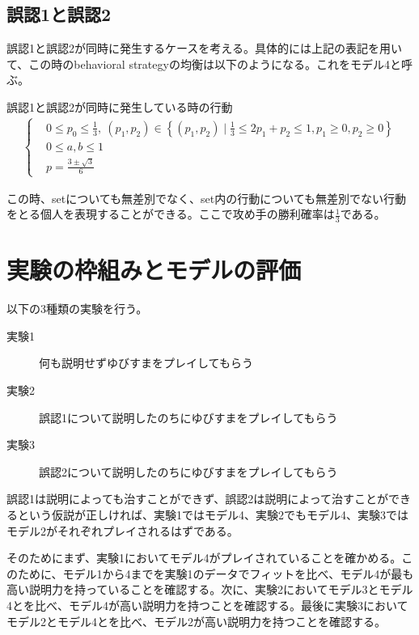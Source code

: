 \documentclass{jsarticle}
\begin{document}
\subsection{誤認1と誤認2}
誤認1と誤認2が同時に発生するケースを考える。具体的には上記の表記を用いて、この時のbehavioral strategyの均衡は以下のようになる。これをモデル4と呼ぶ。
\begin{itembox}[l]{誤認1と誤認2が同時に発生している時の行動}
\begin{align}
	\begin{cases}
    	&0 \leq p_0 \leq \frac{1}{3}, \ (p_1, p_2) \in \left\{ (p_1, p_2) \mid \frac{1}{3} \leq 2p_1 + p_2 \leq 1, p_1 \geq 0, p_2 \geq 0\right\}\\[10pt]
	&0 \leq a, b \leq 1\\[10pt]
	&p = \frac{3\pm \sqrt{3}}{6}
	\end{cases}
\end{align}
\end{itembox}
この時、setについても無差別でなく、set内の行動についても無差別でない行動をとる個人を表現することができる。ここで攻め手の勝利確率は$\frac{1}{3}$である。

\section{実験の枠組みとモデルの評価}
以下の3種類の実験を行う。
\begin{description}
	\item[実験1] 何も説明せずゆびすまをプレイしてもらう
	\item[実験2] 誤認1について説明したのちにゆびすまをプレイしてもらう
	\item[実験3] 誤認2について説明したのちにゆびすまをプレイしてもらう
\end{description}
誤認1は説明によっても治すことができず、誤認2は説明によって治すことができるという仮説が正しければ、実験1ではモデル4、実験2でもモデル4、実験3ではモデル2がそれぞれプレイされるはずである。

そのためにまず、実験1においてモデル4がプレイされていることを確かめる。このために、モデル1から4までを実験1のデータでフィットを比べ、モデル4が最も高い説明力を持っていることを確認する。次に、実験2においてモデル3とモデル4とを比べ、モデル4が高い説明力を持つことを確認する。最後に実験3においてモデル2とモデル4とを比べ、モデル2が高い説明力を持つことを確認する。
\end{document}
